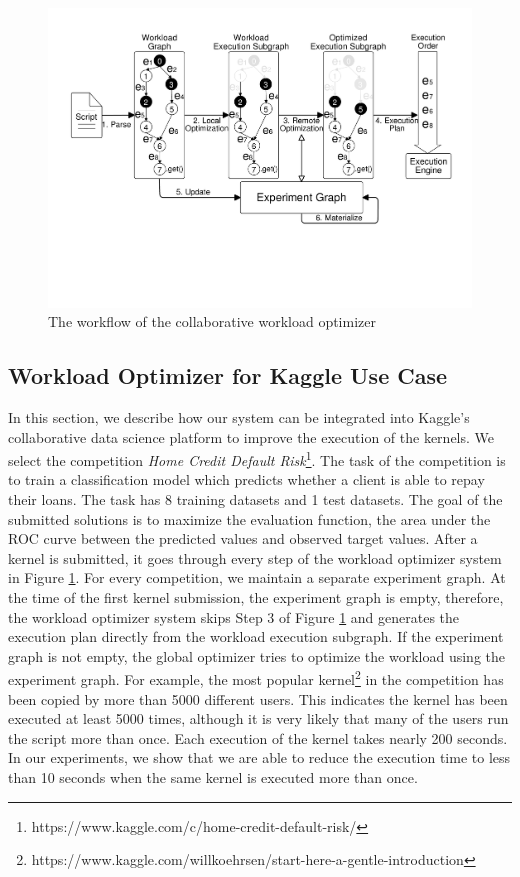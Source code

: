 {\begin{figure}
\centering
\includegraphics[width=\columnwidth]{../images/system-workflow}
\caption{The workflow of the collaborative workload optimizer}
\label{system-workflow}
\end{figure}


\subsection{Workload Optimizer for Kaggle Use Case}
In this section, we describe how our system can be integrated into Kaggle's collaborative data science platform to improve the execution of the kernels.
We select the competition \textit{Home Credit Default Risk}\footnote{https://www.kaggle.com/c/home-credit-default-risk/}.
The task of the competition is to train a classification model which predicts whether a client is able to repay their loans.
The task has 8 training datasets and 1 test datasets.
The goal of the submitted solutions is to maximize the evaluation function, the area under the ROC curve between the predicted values and observed target values.
After a kernel is submitted, it goes through every step of the workload optimizer system in Figure \ref{system-workflow}.
For every competition, we maintain a separate experiment graph.
At the time of the first kernel submission, the experiment graph is empty, therefore, the workload optimizer system skips Step 3 of Figure \ref{system-workflow} and generates the execution plan directly from the workload execution subgraph.
If the experiment graph is not empty, the global optimizer tries to optimize the workload using the experiment graph.
For example, the most popular kernel\footnote{https://www.kaggle.com/willkoehrsen/start-here-a-gentle-introduction} in the competition has been copied by more than 5000 different users.
This indicates the kernel has been executed at least 5000 times, although it is very likely that many of the users run the script more than once.
Each execution of the kernel takes nearly 200 seconds.
In our experiments, we show that we are able to reduce the execution time to less than 10 seconds when the same kernel is executed more than once.
}
